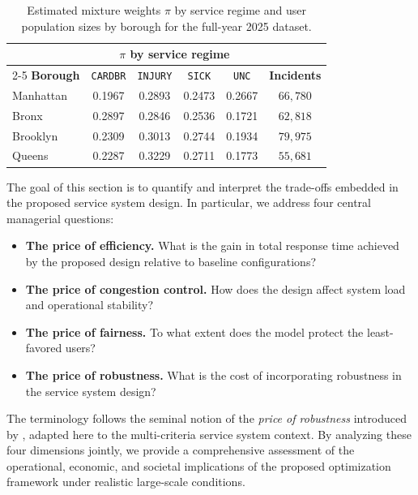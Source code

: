 \documentclass[letter,11pt, reqno]{amsart}
\begin{document}
\begin{table}[t]
\centering
\renewcommand{\arraystretch}{1.25}
\setlength{\tabcolsep}{6pt}
\caption{Estimated mixture weights $\pi$ by service regime and user population sizes by borough for the full-year 2025 dataset.}
\label{tab:case_pi_sizes}
{\small
\begin{tabular}{l c c c c c}
\hline
& \multicolumn{4}{c}{$\pi$ by service regime} & \\
\cline{2-5}
\textbf{Borough} 
& \texttt{CARDBR} & \texttt{INJURY} & \texttt{SICK} & \texttt{UNC} & \textbf{Incidents} \\
\hline
Manhattan & 0.1967 & 0.2893 & 0.2473 & 0.2667 & $66,780$ \\
Bronx     & 0.2897 & 0.2846 & 0.2536 & 0.1721 & $62,818$ \\
Brooklyn  & 0.2309 & 0.3013 & 0.2744 & 0.1934 & $79,975$ \\
Queens    & 0.2287 & 0.3229 & 0.2711 & 0.1773 & $55,681$ \\
\hline
\end{tabular}}
\end{table}

The goal of this section is to quantify and interpret the trade-offs embedded in the proposed service system design. In particular, we address four central managerial questions:

\begin{itemize}
    \item[-] \textbf{The price of efficiency.} What is the gain in total response time achieved by the proposed design relative to baseline configurations?
    \item[-] \textbf{The price of congestion control.} How does the design affect system load and operational stability?
    \item[-] \textbf{The price of fairness.} To what extent does the model protect the least-favored users?
    \item[-] \textbf{The price of robustness.} What is the cost of incorporating robustness in the service system design?
\end{itemize}

The terminology follows the seminal notion of the \emph{price of robustness} introduced by \citet{bertsimas2004price}, adapted here to the multi-criteria service system context. By analyzing these four dimensions jointly, we provide a comprehensive assessment of the operational, economic, and societal implications of the proposed optimization framework under realistic large-scale conditions.
\end{document}
